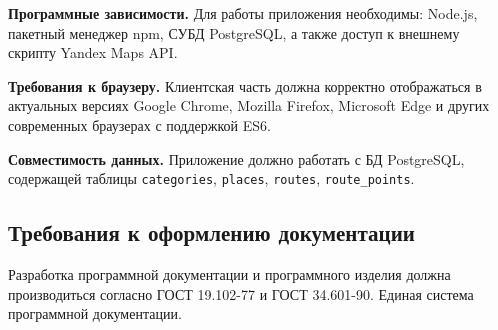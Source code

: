 \textbf{Программные зависимости.} Для работы приложения необходимы:
Node.js, пакетный менеджер npm, СУБД PostgreSQL, а также доступ к внешнему
скрипту Yandex Maps API.

\textbf{Требования к браузеру.} Клиентская часть должна корректно
отображаться в актуальных версиях Google Chrome, Mozilla Firefox,
Microsoft Edge и других современных браузерах с поддержкой ES6.

\textbf{Совместимость данных.} Приложение должно работать с БД PostgreSQL,
содержащей таблицы \texttt{categories}, \texttt{places}, \texttt{routes},
\texttt{route\_points}.

\subsection{Требования к оформлению документации}
Разработка программной документации и программного изделия должна производиться согласно ГОСТ 19.102-77 и ГОСТ 34.601-90. Единая система программной документации.
